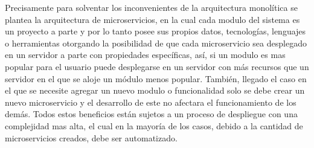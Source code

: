 Precisamente para solventar los inconvenientes de la arquitectura monolítica se plantea la arquitectura de microservicios, en la cual cada modulo del sistema es un proyecto a parte y por lo tanto posee sus propios datos, tecnologías, lenguajes o herramientas otorgando la posibilidad de que cada microservicio sea desplegado en un servidor a parte con propiedades específicas, así, si un modulo es mas popular para el usuario puede desplegarse en un servidor con más recursos que un servidor en el que se aloje un módulo menos popular. También, llegado el caso en el que se necesite agregar un nuevo modulo o funcionalidad solo se debe crear un nuevo microservicio y el desarrollo de este no afectara el funcionamiento de los demás.  Todos estos beneficios están sujetos a un proceso de despliegue  con una complejidad mas alta, el cual en la mayoría de los casos,  debido a la cantidad de microservicios creados, debe ser automatizado.

